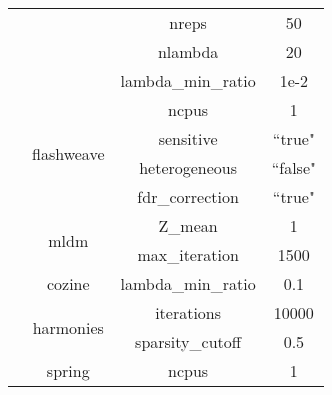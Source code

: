 \begin{table}[H]
\begin{tabular}{|c|c|c|c|}
                             &                                                                                         & nreps                  & 50             \\
                             &                                                                                         & nlambda                & 20             \\
                             &                                                                                         & lambda\_min\_ratio     & 1e-2           \\ \cline{2-4}
                             & \multirow{4}{*}{flashweave}                                                             & ncpus                  & 1              \\
                             &                                                                                         & sensitive              & ``true"         \\
                             &                                                                                         & heterogeneous          & ``false"        \\
                             &                                                                                         & fdr\_correction        & ``true"         \\ \cline{2-4}
                             & \multirow{2}{*}{mldm}                                                                   & Z\_mean                & 1              \\
                             &                                                                                         & max\_iteration         & 1500           \\ \cline{2-4}
                             & cozine                                                                                  & lambda\_min\_ratio     & 0.1            \\ \cline{2-4}
                             & \multirow{2}{*}{harmonies}                                                              & iterations             & 10000          \\
                             &                                                                                         & sparsity\_cutoff       & 0.5            \\ \cline{2-4}
                             & \multirow{3}{*}{spring}                                                                 & ncpus                  & 1              \\

\end{tabular}
\end{table}
